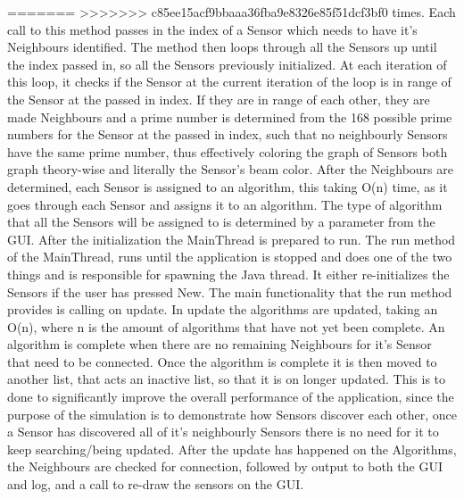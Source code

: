 =======
>>>>>>> c85ee15acf9bbaaa36fba9e8326e85f51dcf3bf0
times. Each call to this method passes in the index of a Sensor which needs to 
have it's Neighbours identified. The method then loops through all the Sensors up 
until the index passed in, so all the Sensors previously initialized. At each 
iteration of this loop, it checks if the Sensor at the current iteration of the 
loop is in range of the Sensor at the passed in index. If they are in range of 
each other, they are made Neighbours and a prime number is determined from the 168 
possible prime numbers for the Sensor at the passed in index, such that no 
neighbourly Sensors have the same prime number, thus effectively coloring the 
graph of Sensors both graph theory-wise and literally the Sensor's beam color. 
After the Neighbours are determined, each Sensor is assigned to an algorithm, this 
taking O(n) time, as it goes through each Sensor and assigns it to an algorithm. 
The type of algorithm that all the Sensors will be assigned to is determined by a 
parameter from the GUI. After the initialization the MainThread is prepared to 
run.  The run method of the MainThread, runs until the application is stopped and 
does one of the two things and is responsible for spawning the Java thread. It 
either re-initializes the Sensors if the user has pressed New. The main 
functionality that the run method provides is calling on update. In update the 
algorithms are updated, taking an O(n), where n is the amount of algorithms that 
have not yet been complete. An algorithm is complete when there are no remaining 
Neighbours for it's Sensor that need to be connected. Once the algorithm is 
complete it is then moved to another list, that acts an inactive list, so that it 
is on longer updated. This is to done to significantly improve the overall 
performance of the application, since the purpose of the simulation is to 
demonstrate how Sensors discover each other, once a Sensor has discovered all of 
it's neighbourly Sensors there is no need for it to keep searching/being updated. 
After the update has happened on the Algorithms, the Neighbours are checked for 
connection, followed by output to both the GUI and log, and a call to re-draw the 
sensors on the GUI. 

